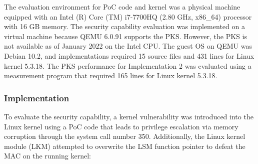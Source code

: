 %
The evaluation environment for PoC code and kernel was a physical machine
equipped with an Intel (R) Core (TM) i7-7700HQ (2.80 GHz, x86\_64) processor
with 16 GB memory.
%
%
%
The security capability evaluation was implemented on a virtual machine because
QEMU 6.0.91 supports the PKS. However, the PKS is not available as of January
2022 on the Intel CPU.
%
The guest OS on QEMU was Debian 10.2, and implementations required 15 source
files and 431 lines for Linux kernel 5.3.18.
%
The PKS performance for Implementation 2 was evaluated using a
measurement program that required 165 lines for Linux kernel 5.3.18.



\subsubsection{Implementation}
%
%
To evaluate the security capability, a kernel vulnerability was introduced into
the Linux kernel using a PoC code \cite{CVE-2017-16995} that leads to privilege
escalation via memory corruption through the system call number 350.
%
Additionally, the Linux kernel module (LKM) attempted to overwrite the LSM function pointer to
defeat the MAC on the running kernel:

